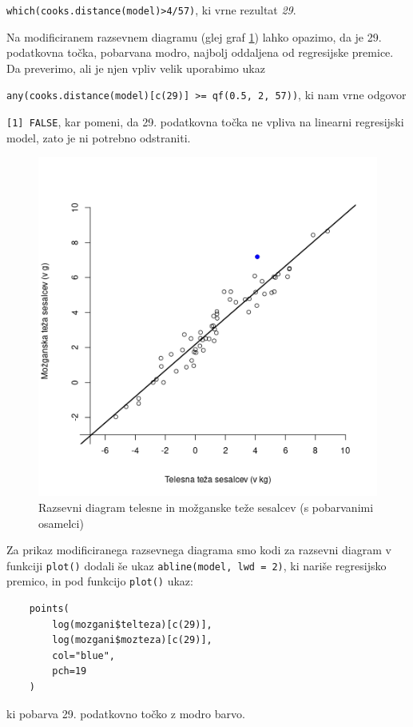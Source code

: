 \noindent \verb|which(cooks.distance(model)>4/57)|, ki vrne rezultat \emph{29}.

Na modificiranem razsevnem diagramu (glej graf \ref{img:razsevni-diagram-pobarvan}) lahko opazimo, da je 29. podatkovna
točka, pobarvana modro, najbolj oddaljena od regresijske premice.
Da preverimo, ali je njen vpliv velik uporabimo ukaz

\noindent \verb|any(cooks.distance(model)[c(29)] >= qf(0.5, 2, 57))|,
ki nam vrne odgovor

\noindent \verb|[1] FALSE|, kar pomeni, da 29. podatkovna točka ne vpliva na linearni regresijski model,
zato je ni potrebno odstraniti.

\begin{figure}[h]
    \centering
    \includegraphics[scale=0.5]{res/razsevni-diagram-pobarvan.png}
    \caption{Razsevni diagram telesne in možganske teže sesalcev (s pobarvanimi osamelci)}
    \label{img:razsevni-diagram-pobarvan}
\end{figure}

Za prikaz modificiranega razsevnega diagrama smo kodi za razsevni diagram v funkciji \verb|plot()| dodali še ukaz
\verb|abline(model, lwd = 2)|, ki nariše regresijsko premico, in pod funkcijo \verb|plot()| ukaz:

\begin{verbatim}
    points(
        log(mozgani$telteza)[c(29)],
        log(mozgani$mozteza)[c(29)],
        col="blue",
        pch=19
    )
\end{verbatim}

ki pobarva 29. podatkovno točko z modro barvo.